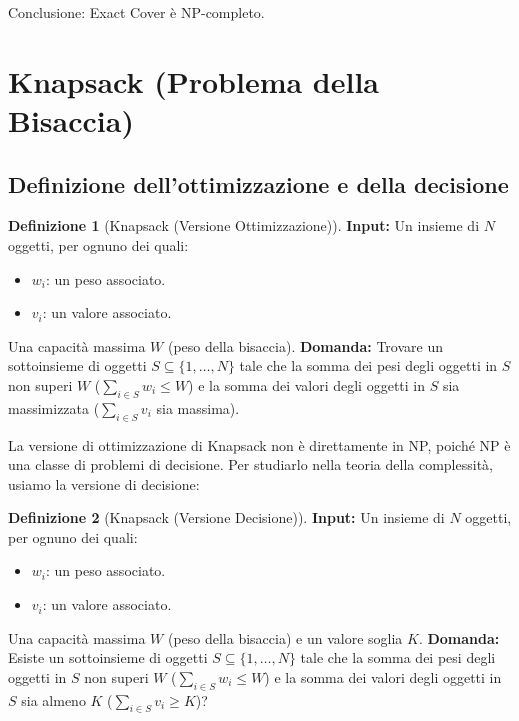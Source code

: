 \documentclass[a4paper]{article}
\theoremstyle{definition} %
\newtheorem{definition}{Definizione}
\begin{document}
Conclusione: Exact Cover è NP-completo.

\section{Knapsack (Problema della Bisaccia)}

\subsection{Definizione dell'ottimizzazione e della decisione}

\begin{definition}[Knapsack (Versione Ottimizzazione)]
\textbf{Input:}
Un insieme di $N$ oggetti, per ognuno dei quali:
\begin{itemize}
    \item $w_i$: un peso associato.
    \item $v_i$: un valore associato.
\end{itemize}
Una capacità massima $W$ (peso della bisaccia).
\textbf{Domanda:} Trovare un sottoinsieme di oggetti $S \subseteq \{1, \ldots, N\}$ tale che la somma dei pesi degli oggetti in $S$ non superi $W$ ($\sum_{i \in S} w_i \le W$) e la somma dei valori degli oggetti in $S$ sia massimizzata ($\sum_{i \in S} v_i$ sia massima).
\end{definition}

La versione di ottimizzazione di Knapsack non è direttamente in NP, poiché NP è una classe di problemi di decisione. Per studiarlo nella teoria della complessità, usiamo la versione di decisione:

\begin{definition}[Knapsack (Versione Decisione)]
\textbf{Input:}
Un insieme di $N$ oggetti, per ognuno dei quali:
\begin{itemize}
    \item $w_i$: un peso associato.
    \item $v_i$: un valore associato.
\end{itemize}
Una capacità massima $W$ (peso della bisaccia) e un valore soglia $K$.
\textbf{Domanda:} Esiste un sottoinsieme di oggetti $S \subseteq \{1, \ldots, N\}$ tale che la somma dei pesi degli oggetti in $S$ non superi $W$ ($\sum_{i \in S} w_i \le W$) e la somma dei valori degli oggetti in $S$ sia almeno $K$ ($\sum_{i \in S} v_i \ge K$)?
\end{definition}
\end{document}
